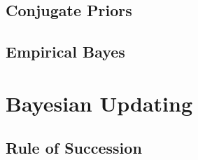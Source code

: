 \documentclass[11pt]{report} %
\begin{document}
\subsection{Conjugate Priors}

\subsection{Empirical Bayes}

\section{Bayesian Updating}

\subsection{Rule of Succession}
\end{document}
